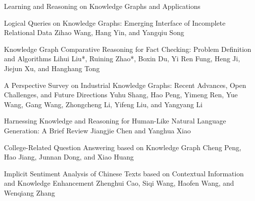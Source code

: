 \documentclass[11pt]{article}
\begin{document}
\begin{bulletin}
\begin{articlesection}{Learning and Reasoning on Knowledge Graphs and Applications}

% 


\begin{article}
{Logical Queries on Knowledge Graphs: Emerging Interface of Incomplete Relational Data}
{Zihao Wang, Hang Yin, and Yangqiu Song}

\end{article}

\begin{article}
{Knowledge Graph Comparative Reasoning for Fact Checking: Problem Definition and Algorithms}
{Lihui Liu*, Ruining Zhao*,  Boxin Du, Yi Ren Fung, Heng Ji, Jiejun Xu, and Hanghang Tong}

\end{article}


\begin{article}
{A Perspective Survey on Industrial Knowledge Graphs: Recent Advances, Open Challenges, and Future Directions}
{Yuhu Shang, Hao Peng, Yimeng Ren, Yue Wang, Gang Wang, Zhongcheng Li, Yifeng Liu, and Yangyang Li}

\end{article}


\begin{article}
{Harnessing Knowledge and Reasoning for Human-Like Natural Language Generation: A Brief Review}
{Jiangjie Chen and Yanghua Xiao}

\end{article}

\begin{article}
{College-Related Question Answering based on Knowledge Graph}
{Cheng Peng,  Hao Jiang, Junnan Dong, and Xiao Huang}

\end{article}

\begin{article}
{Implicit Sentiment Analysis of Chinese Texts based on Contextual Information and Knowledge Enhancement}
{Zhenghui Cao, Siqi Wang,  Haofen Wang, and Wenqiang Zhang }

\end{article}



\end{articlesection}
\end{bulletin}
\end{document}
